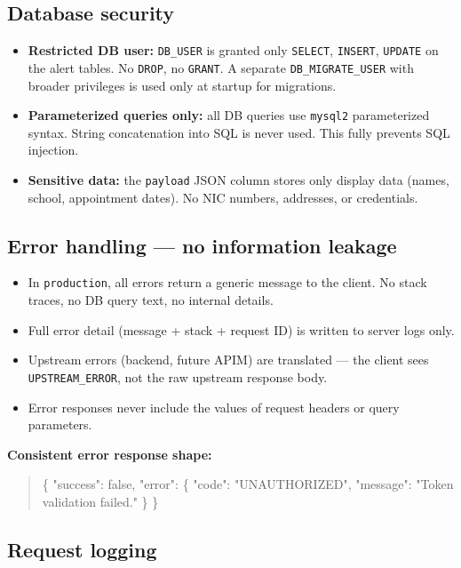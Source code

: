 \documentclass[11pt]{article}
\begin{document}
\subsection{Database security}

\begin{itemize}
  \item \textbf{Restricted DB user:} \texttt{DB\_USER} is granted only \texttt{SELECT},
        \texttt{INSERT}, \texttt{UPDATE} on the alert tables. No \texttt{DROP}, no \texttt{GRANT}.
        A separate \texttt{DB\_MIGRATE\_USER} with broader privileges is used only at startup
        for migrations.
  \item \textbf{Parameterized queries only:} all DB queries use \texttt{mysql2} parameterized
        syntax. String concatenation into SQL is never used. This fully prevents SQL injection.
  \item \textbf{Sensitive data:} the \texttt{payload} JSON column stores only display data
        (names, school, appointment dates). No NIC numbers, addresses, or credentials.
\end{itemize}

\subsection{Error handling --- no information leakage}

\begin{itemize}
  \item In \texttt{production}, all errors return a generic message to the client. No stack
        traces, no DB query text, no internal details.
  \item Full error detail (message + stack + request ID) is written to server logs only.
  \item Upstream errors (backend, future APIM) are translated --- the client sees
        \texttt{UPSTREAM\_ERROR}, not the raw upstream response body.
  \item Error responses never include the values of request headers or query parameters.
\end{itemize}

\textbf{Consistent error response shape:}
\begin{quote}
\small\ttfamily
\{ "success": false, "error": \{ "code": "UNAUTHORIZED", "message": "Token validation failed." \} \}
\end{quote}

\subsection{Request logging}
\end{document}
